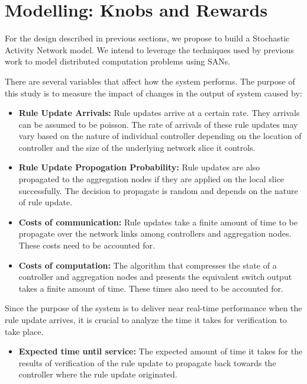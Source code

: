 \documentclass[a4paper,10pt]{article}
\begin{document}
\section {Modelling: Knobs and Rewards}
For the design described in previous sections, we propose to build a Stochastic Activity Network model. We intend to leverage the techniques used by previous work \cite{mcleod} to model distributed computation problems using SANs. 

There are several variables that affect how the system performs. The purpose of this study is to measure the impact of changes in the output of system caused by:

\begin{itemize}
 \item \textbf{Rule Update Arrivals:} Rule updates arrive at a certain rate. They arrivals can be assumed to be poisson. The rate of arrivals of these rule updates may vary based on the nature of individual controller depending on the location of controller and the size of the underlying network slice it controls.
 \item \textbf{Rule Update Propogation Probability:} Rule updates are also propagated to the aggregation nodes if they are applied on the local slice successfully. The decision to propagate is random and depends on the nature of rule update. 
 \item \textbf{Costs of communication:} Rule updates take a finite amount of time to be propagate over the network links among controllers and aggregation nodes. These costs need to be accounted for. 
 \item \textbf{Costs of computation:} The algorithm that compresses the state of a controller and aggregation nodes and presents the equivalent switch output takes a finite amount of time. These times also need to be accounted for.
 
 \end{itemize}

Since the purpose of the system is to deliver near real-time performance when the rule update arrives, it is crucial to analyze the time it takes for verification to take place.

\begin{itemize}
 \item \textbf{Expected time until service:} The expected amount of time it takes for the results of verification of the rule update to propagate back towards the controller where the rule update originated. 
\end{itemize}




\end{document}
